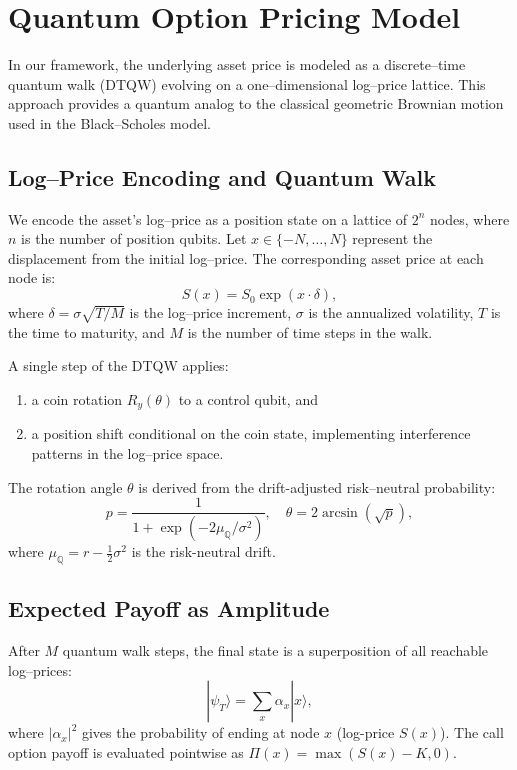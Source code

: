 \documentclass[11pt]{article}
\begin{document}
\section{Quantum Option Pricing Model}

In our framework, the underlying asset price is modeled as a discrete--time quantum walk (DTQW) evolving on a one--dimensional log--price lattice. This approach provides a quantum analog to the classical geometric Brownian motion used in the Black--Scholes model.

\subsection{Log--Price Encoding and Quantum Walk}

We encode the asset's log--price as a position state on a lattice of $2^n$ nodes, where $n$ is the number of position qubits. Let $x \in \{-N, \ldots, N\}$ represent the displacement from the initial log--price. The corresponding asset price at each node is:
\begin{equation}
S(x) = S_0 \exp(x \cdot \delta),
\end{equation}
where $\delta = \sigma \sqrt{T / M}$ is the log--price increment, $\sigma$ is the annualized volatility, $T$ is the time to maturity, and $M$ is the number of time steps in the walk.

A single step of the DTQW applies:
\begin{enumerate}
\item a coin rotation $R_y(\theta)$ to a control qubit, and
\item a position shift conditional on the coin state, implementing interference patterns in the log--price space.
\end{enumerate}

The rotation angle $\theta$ is derived from the drift-adjusted risk--neutral probability:
\begin{equation}
p = \frac{1}{1 + \exp(-2\mu_{\mathbb{Q}}/\sigma^2)}, \quad \theta = 2 \arcsin(\sqrt{p}),
\end{equation}
where $\mu_{\mathbb{Q}} = r - \frac{1}{2}\sigma^2$ is the risk-neutral drift.

\subsection{Expected Payoff as Amplitude}

After $M$ quantum walk steps, the final state is a superposition of all reachable log--prices:
\begin{equation}
|\psi_T\rangle = \sum_x \alpha_x |x\rangle,
\end{equation}
where $|\alpha_x|^2$ gives the probability of ending at node $x$ (log-price $S(x)$). The call option payoff is evaluated pointwise as $\Pi(x) = \max(S(x) - K, 0)$.
\end{document}

